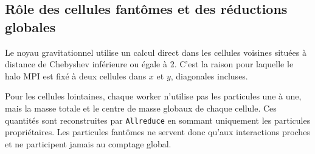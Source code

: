\subsection{Rôle des cellules fantômes et des réductions globales}

Le noyau gravitationnel utilise un calcul direct dans les cellules voisines situées à distance de Chebyshev inférieure ou égale à 2. C'est la raison pour laquelle le halo MPI est fixé à deux cellules dans \(x\) et \(y\), diagonales incluses.

Pour les cellules lointaines, chaque worker n'utilise pas les particules une à une, mais la masse totale et le centre de masse globaux de chaque cellule. Ces quantités sont reconstruites par \texttt{Allreduce} en sommant uniquement les particules propriétaires. Les particules fantômes ne servent donc qu'aux interactions proches et ne participent jamais au comptage global.
